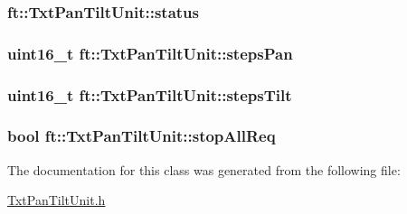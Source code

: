 \subsubsection[{\texorpdfstring{status}{status}}]{ ft\+::\+Txt\+Pan\+Tilt\+Unit\+::status\hspace{0.3cm}{\ttfamily [protected]}}\hypertarget{classft_1_1_txt_pan_tilt_unit_aa1341a261f7ce640d23c7576d1883791}{}\label{classft_1_1_txt_pan_tilt_unit_aa1341a261f7ce640d23c7576d1883791}
\subsubsection[{\texorpdfstring{steps\+Pan}{stepsPan}}]{\setlength{\rightskip}{0pt plus 5cm}uint16\+\_\+t ft\+::\+Txt\+Pan\+Tilt\+Unit\+::steps\+Pan\hspace{0.3cm}{\ttfamily [protected]}}\hypertarget{classft_1_1_txt_pan_tilt_unit_abf2f9ae19a026abf403bb8e6878ff0d8}{}\label{classft_1_1_txt_pan_tilt_unit_abf2f9ae19a026abf403bb8e6878ff0d8}
\subsubsection[{\texorpdfstring{steps\+Tilt}{stepsTilt}}]{\setlength{\rightskip}{0pt plus 5cm}uint16\+\_\+t ft\+::\+Txt\+Pan\+Tilt\+Unit\+::steps\+Tilt\hspace{0.3cm}{\ttfamily [protected]}}\hypertarget{classft_1_1_txt_pan_tilt_unit_ae350fb86cc91154a2c699621b672b5bd}{}\label{classft_1_1_txt_pan_tilt_unit_ae350fb86cc91154a2c699621b672b5bd}
\subsubsection[{\texorpdfstring{stop\+All\+Req}{stopAllReq}}]{\setlength{\rightskip}{0pt plus 5cm}bool ft\+::\+Txt\+Pan\+Tilt\+Unit\+::stop\+All\+Req\hspace{0.3cm}{\ttfamily [protected]}}\hypertarget{classft_1_1_txt_pan_tilt_unit_a5d3760c33a938591211de2606909bc90}{}\label{classft_1_1_txt_pan_tilt_unit_a5d3760c33a938591211de2606909bc90}


The documentation for this class was generated from the following file\+:\begin{DoxyCompactItemize}
\item 
\hyperlink{_txt_pan_tilt_unit_8h}{Txt\+Pan\+Tilt\+Unit.\+h}\end{DoxyCompactItemize}
